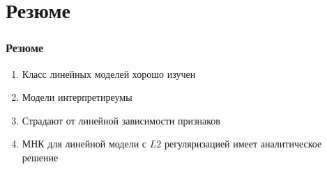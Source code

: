 \documentclass{beamer}
\begin{document}
	\section*{Резюме}
	
	
	\begin{frame}
		\frametitle{Резюме}
		\begin{enumerate}
			\item Класс линейных моделей хорошо изучен
			\item Модели интерпретиреумы
			\item Страдают от линейной зависимости признаков
			\item МНК для линейной модели  с $L2$ регуляризацией имеет аналитическое решение
		\end{enumerate}
	\end{frame}
	
\end{document}
